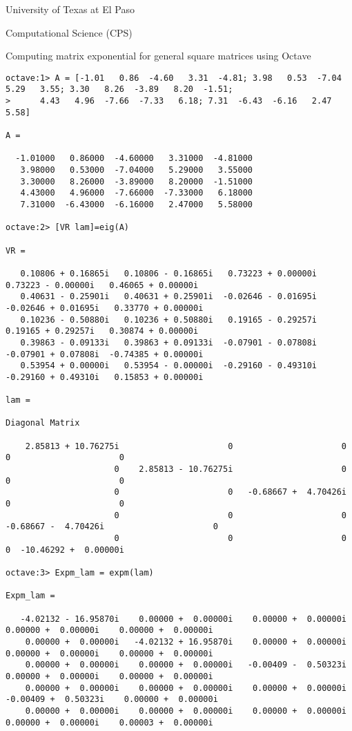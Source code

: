\documentclass{article}
\begin{document}
\centerline{\sc \large University of Texas at El Paso}
\centerline{\sc \large Computational Science (CPS) }
\vspace{1pc}
\centerline{\sc \Large Computing matrix exponential for general square matrices using Octave}
\begin{small}
\begin{verbatim}
octave:1> A = [-1.01   0.86  -4.60   3.31  -4.81; 3.98   0.53  -7.04   5.29   3.55; 3.30   8.26  -3.89   8.20  -1.51;
>      4.43   4.96  -7.66  -7.33   6.18; 7.31  -6.43  -6.16   2.47   5.58]

A =

  -1.01000   0.86000  -4.60000   3.31000  -4.81000
   3.98000   0.53000  -7.04000   5.29000   3.55000
   3.30000   8.26000  -3.89000   8.20000  -1.51000
   4.43000   4.96000  -7.66000  -7.33000   6.18000
   7.31000  -6.43000  -6.16000   2.47000   5.58000

octave:2> [VR lam]=eig(A)

VR =

   0.10806 + 0.16865i   0.10806 - 0.16865i   0.73223 + 0.00000i   0.73223 - 0.00000i   0.46065 + 0.00000i
   0.40631 - 0.25901i   0.40631 + 0.25901i  -0.02646 - 0.01695i  -0.02646 + 0.01695i   0.33770 + 0.00000i
   0.10236 - 0.50880i   0.10236 + 0.50880i   0.19165 - 0.29257i   0.19165 + 0.29257i   0.30874 + 0.00000i
   0.39863 - 0.09133i   0.39863 + 0.09133i  -0.07901 - 0.07808i  -0.07901 + 0.07808i  -0.74385 + 0.00000i
   0.53954 + 0.00000i   0.53954 - 0.00000i  -0.29160 - 0.49310i  -0.29160 + 0.49310i   0.15853 + 0.00000i

lam =

Diagonal Matrix

    2.85813 + 10.76275i                      0                      0                      0                      0
                      0    2.85813 - 10.76275i                      0                      0                      0
                      0                      0   -0.68667 +  4.70426i                      0                      0
                      0                      0                      0   -0.68667 -  4.70426i                      0
                      0                      0                      0                      0  -10.46292 +  0.00000i

octave:3> Expm_lam = expm(lam)

Expm_lam =

   -4.02132 - 16.95870i    0.00000 +  0.00000i    0.00000 +  0.00000i    0.00000 +  0.00000i    0.00000 +  0.00000i
    0.00000 +  0.00000i   -4.02132 + 16.95870i    0.00000 +  0.00000i    0.00000 +  0.00000i    0.00000 +  0.00000i
    0.00000 +  0.00000i    0.00000 +  0.00000i   -0.00409 -  0.50323i    0.00000 +  0.00000i    0.00000 +  0.00000i
    0.00000 +  0.00000i    0.00000 +  0.00000i    0.00000 +  0.00000i   -0.00409 +  0.50323i    0.00000 +  0.00000i
    0.00000 +  0.00000i    0.00000 +  0.00000i    0.00000 +  0.00000i    0.00000 +  0.00000i    0.00003 +  0.00000i


\end{verbatim}
\end{small}
\end{document}
